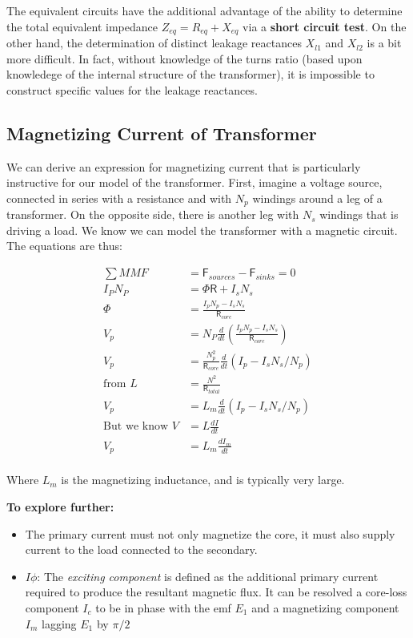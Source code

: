 \documentclass{book}
\begin{document}
The equivalent circuits have the additional advantage of the ability to determine the total equivalent impedance $Z_{eq}= R_{eq} + X_{eq}$ via a \textbf{short circuit test}. On the other hand, the determination of distinct leakage reactances $X_{l1}$ and $X_{l2}$ is a bit more difficult. In fact, without knowledge of the turns ratio (based upon knowledege of the internal structure of the transformer), it is impossible to construct specific values for the leakage reactances.

\subsection{Magnetizing Current of Transformer}

We can derive an expression for magnetizing current that is particularly instructive for our model of the transformer. First, imagine a voltage source, connected in series with a resistance and with $N_p$  windings around a leg of a transformer. On the opposite side, there is another leg with $N_s$ windings that is driving a load. We know we can model the transformer with a magnetic circuit. The equations are thus:

\begin{align*}
	\sum MMF &= \mathsf{F}_{sources} - \mathsf{F}_{sinks} = 0 \\
	I_P N_P &= \Phi \mathsf{R} + I_s N_s \\
	\Phi &= \frac{I_p N_p - I_s N_s}{\mathsf{R}_{core}} \\
	V_p &= N_P \frac{d}{dt} (\frac{I_p N_p - I_s N_s}{\mathsf{R}_{core}}) \\
	V_p &= \frac{N_p^2}{\mathsf{R}_{core}} \frac{d}{dt} (I_p - I_s N_s/N_p) \\
	\text{from } L&= \frac{N^2}{\mathsf{R}_{total}} \\
	V_p &= L_m \frac{d}{dt} (I_p - I_s N_s / N_p) \\
	\text{But we know }V&= L\frac{dI}{dt} \\
	V_p &= L_m \frac{dI_m}{dt} \\
\end{align*}

Where $L_m$ is the magnetizing inductance, and is typically very large.

\textbf{To explore further:}
\begin{itemize}
	\item The primary current must not only magnetize the core, it must also supply current to the load connected to the secondary.
	\item $I\phi$: The \textit{exciting component} is defined as the additional primary current required to produce the resultant magnetic flux. It can be resolved a core-loss component $I_c$ to be in phase with the emf $E_1$ and a magnetizing component $I_m$ lagging $E_1$ by $\pi/2$
\end{itemize}
\end{document}
